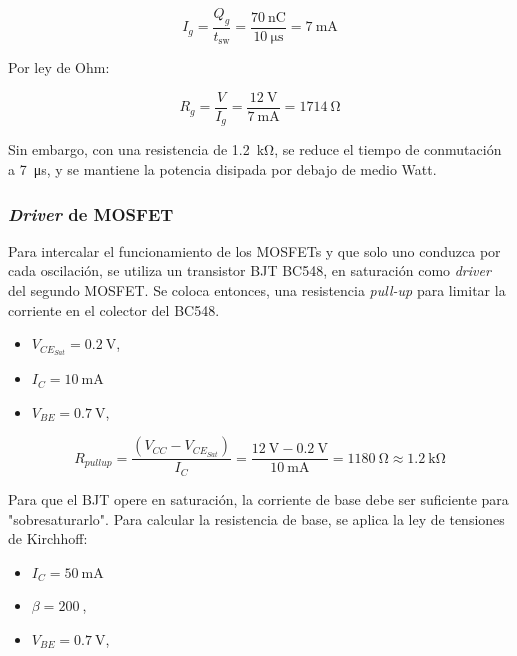 \begin{equation}
I_g = \frac{Q_g}{t_\mathrm{sw}} = \frac{\SI{70}{\nano\coulomb}}{\SI{10}{\micro\second}} = \SI{7}{\milli\ampere}
\label{eq:inversor:ig}
\end{equation}

Por ley de Ohm:

\begin{equation}
R_g = \frac{V}{I_g} = \frac{\SI{12}{\volt}}{\SI{7}{\milli\ampere}} = \SI{1714}{\ohm}
\label{eq:inversor:rg}
\end{equation}

Sin embargo, con una resistencia de \SI{1.2}{\kilo\ohm}, se reduce el tiempo de conmutación a \SI{7}{\micro\second}, y se mantiene la potencia disipada por debajo de medio Watt.

\subsubsection{\textit{Driver} de MOSFET}

Para intercalar el funcionamiento de los MOSFETs y que solo uno conduzca por cada oscilación, se utiliza un transistor BJT BC548, en saturación como \textit{driver} del segundo MOSFET.
Se coloca entonces, una resistencia \textit{pull-up} para limitar la corriente en el colector del BC548. 

\begin{itemize}[noitemsep]
    \item $V_{CE_{Sat}} = \SI{0.2}{\volt}$, \parencite{BC548}
    \item $I_C = \SI{10}{\milli\ampere}$
    \item $V_{BE} = \SI{0.7}{\volt}$, \parencite{BC548} 
\end{itemize}

\begin{equation}
R_{pull up} = \frac{(V_{CC} - V_{CE_{Sat}})}{{I_{C}}} =\frac{\SI{12}{\volt} - \SI{0.2}{\volt}}{\SI{10}{\milli\ampere}} = \SI{1180}{\ohm} \approx \SI{1.2}{\kilo\ohm}
\label{eq:inversor:pullup}
\end{equation}

Para que el BJT opere en saturación, la corriente de base debe ser suficiente para "sobresaturarlo". 
Para calcular la resistencia de base, se aplica la ley de tensiones de Kirchhoff:

\begin{itemize}[noitemsep]
    \item $I_C = \SI{50}{\milli\ampere}$
    \item $\beta = 200\ $, \parencite{BC548} 
    \item $V_{BE} = \SI{0.7}{\volt}$, \parencite{BC548}  
\end{itemize}

